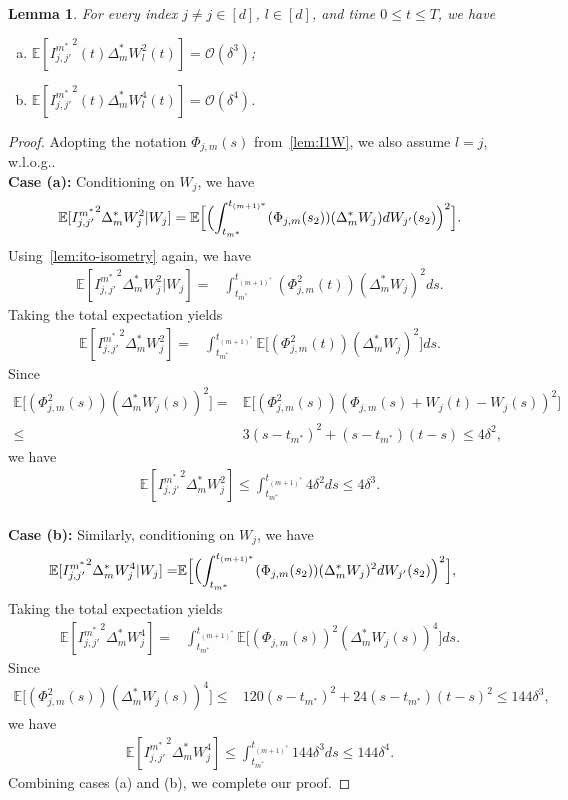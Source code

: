 \documentclass[11pt, a4paper, onecolumn]{article}
\newcommand{\E}{\mathbb{E}}
\newcommand{\m}{m}
\newcommand{\calO}{\mathcal{O}}
\newcommand{\ms}{{m^*}}
\newcommand{\mos}{{(m+1)^*}}
\newcommand{\Dms}{{\Delta^{*}_{m}}}
\newcommand{\Ijjpms}{ {I_{j,j'}^{\ms}} }
\newcommand{\Phjms}{\Phi_{j,\m}}
\newtheorem{lemma}{Lemma}
\begin{document}
\begin{appendices}
\begin{lemma}For every index $j \neq j\in [d]$, $l\in [d]$, and time $0\le t \le T$, we have\label{lem:I2W2-I2W4}
     \begin{enumerate}[(a)]
         \item $\E[\Ijjpms^2(t)\Dms W_l^2(t)]=\calO(\delta^3)$;
         \item  $\E[\Ijjpms^2(t)\Dms W_l^4(t)]=\calO(\delta^4)$.
     \end{enumerate}
\end{lemma}
\begin{proof} Adopting the notation $\Phjms(s)$ from~\cref{lem:I1W}, we also assume $l=j$, w.l.o.g.. \\
\textbf{Case (a):} Conditioning on $W_j$, we have
\begin{align*}
    \E[\Ijjpms^2\Dms W_j^2|W_j] = \E\Bigl[ \Bigl( \int_{t_\ms}^{t_\mos} (\Phjms(s_2))(\Dms W_j) dW_{j'}(s_2) \Bigr)^2 \Big].
\end{align*}
Using~\cref{lem:ito-isometry} again, we have
\begin{align*}
     \E[\Ijjpms^2\Dms W_j^2|W_j] = &  \int_{t_\ms}^{t_\mos} (\Phjms^2(t))(\Dms W_j)^2 ds.
\end{align*}
Taking the total expectation yields
\begin{align*}
     \E[\Ijjpms^2\Dms W_j^2] = & \int_{t_\ms}^{t_\mos} \E\big[(\Phjms^2(t))(\Dms W_j)^2\big] ds.
\end{align*}
Since 
\begin{align*}
    \E\big[(\Phjms^2(s))(\Dms W_j(s))^2\big] = & \E\big[(\Phjms^2(s))(\Phjms(s) + W_j(t) - W_j(s)  )^2\big] \\
    \le & 3(s-t_{\ms})^2 + (s-t_{\ms}) (t-s) \le 4 \delta^2,
\end{align*}
we have
\begin{align*}
   \E[\Ijjpms^2\Dms W_j^2]  \le \int_{t_\ms}^{t_\mos} 4\delta^2 ds \le 4\delta^3.
\end{align*}
\\
\textbf{Case (b):} Similarly, conditioning on $W_j$, we have
\begin{align*}
    \E[\Ijjpms^2\Dms W_j^4|W_j] = & \E\Bigl[ \Bigl( \int_{t_\ms}^{t_\mos} (\Phjms(s_2))(\Dms W_j)^2 dW_{j'}(s_2) \Bigr)^2 \Big],
\end{align*}
Taking the total expectation yields
\begin{align*}
     \E[\Ijjpms^2\Dms W_j^4]  = & \int_{t_\ms}^{t_\mos} \E\big[(\Phjms(s))^2(\Dms W_j(s))^4\big] ds.
\end{align*}
Since 
\begin{align*}
    \E\big[(\Phjms^2(s))(\Dms W_j(s))^4\big] \le & 120(s-t_{\ms})^2 + 24(s-t_{\ms}) (t-s)^2 \le 144 \delta^3,
\end{align*}
we have
\begin{align*}
   \E[\Ijjpms^2\Dms W_j^4]  \le \int_{t_\ms}^{t_\mos} 144\delta^3 ds \le 144\delta^4.
\end{align*}
Combining cases (a) and (b), we complete our proof.
\end{proof}

\end{appendices}
\end{document}
